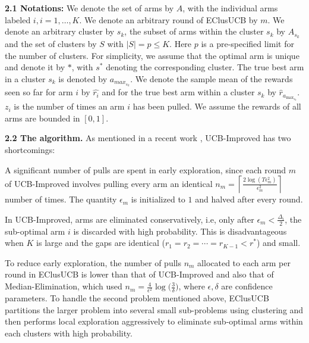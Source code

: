 \textbf{2.1 Notations:} We denote the set of arms by $A$, with the individual arms labeled $i, i=1,\ldots,K$. We denote an arbitrary round of EClusUCB by $m$. We denote an arbitrary cluster by $s_{k}$, the subset of arms within the cluster $s_k$ by  $A_{s_{k}}$ and the set of clusters by $S$ with $|S|=p\leq K$. Here $p$ is a pre-specified limit for the number of clusters.
For simplicity, we assume that the optimal arm is unique and denote it by ${*}$, with $s^{*}$ denoting the corresponding cluster. The true best arm in a cluster $s_{k}$ is denoted by $a_{max_{s_{k}}}$.  
We denote the sample mean of the rewards seen so far for arm $i$ by $\hat{r_i}$ and for the true best arm within a cluster $s_k$ by $\hat{r}_{a_{\max_{s_{k}}}}$. $z_i$ is the number of times an arm $i$ has been pulled. We assume the rewards of all arms are bounded in $[0,1]$.

\textbf{2.2 The algorithm.} As mentioned in a recent work \cite{liu2016modification}, UCB-Improved has two shortcomings: 	\\
\begin{inparaenum}[\bfseries(i)]
\item A significant number of pulls are spent in early exploration, since each round $m$ of UCB-Improved involves pulling every arm an identical $n_{m}=\left\lceil \frac{ 2\log(T\epsilon^{2}_{m})}{\epsilon^{2}_{m}} \right\rceil$ number of times. The quantity $\epsilon_{m}$ is initialized to $1$ and halved after every round.\\
\item In UCB-Improved, arms are eliminated conservatively, i.e, only after $\epsilon_{m}<\frac{\Delta_{i}}{2}$, the sub-optimal arm $i$ is discarded with high probability. This is disadvantageous when $K$ is large and the gaps are identical ($r_{1}=r_{2}=\cdots=r_{K-1}<r^{*}$) and small.\\
\end{inparaenum}
To reduce early exploration, the number of pulls $n_m$ allocated to each arm per round in EClusUCB is lower than that of UCB-Improved and also that of Median-Elimination, which used $n_m=\frac{4}{\epsilon^{2}}\log\big(\frac{3}{\delta}\big)$, where $\epsilon,\delta$ are confidence parameters.
To handle the second problem mentioned above, EClusUCB partitions the larger problem into several small sub-problems using clustering and then performs local exploration aggressively to eliminate sub-optimal arms within each clusters with high probability.

